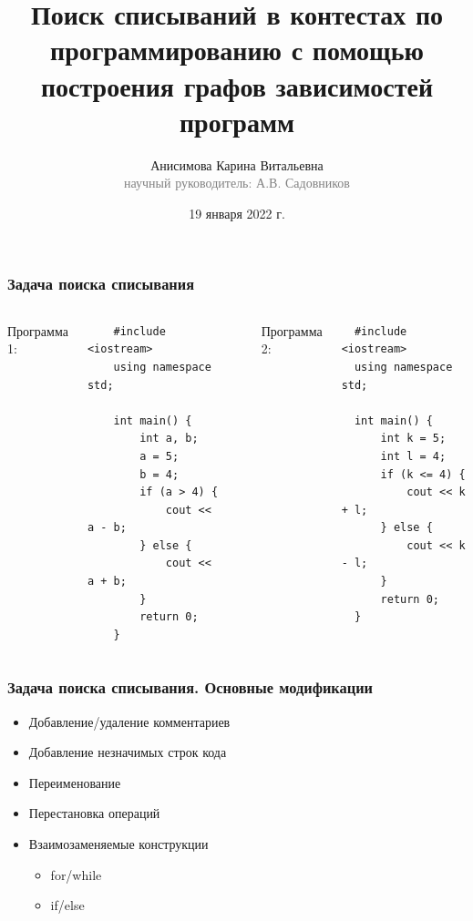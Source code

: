 \documentclass[10pt]{beamer}
\begin{document}
\title[Поиск списываний в контестах]{Поиск списываний в контестах по программированию с помощью построения графов зависимостей программ}

\author[Анисимова К.В.]{Анисимова Карина Витальевна\\{\footnotesize\textcolor{gray}{научный руководитель: А.В. Садовников}}}
\date{19 января 2022 г.}
\frame{\titlepage}

\begin{frame}[fragile]\frametitle{Задача поиска списывания}
\begin{columns}[T]
  Программа 1:

  \begin{verbatim}
    #include <iostream>
    using namespace std;
    
    int main() {
        int a, b;
        a = 5;
        b = 4;
        if (a > 4) {
            cout << a - b;
        } else {
            cout << a + b;
        }
        return 0;
    }
  \end{verbatim}
  
  	\rule{.1mm}{0.7\textheight}


  Программа 2:

  \begin{verbatim}
  #include <iostream>
  using namespace std;
  
  int main() {
      int k = 5;
      int l = 4;
      if (k <= 4) {
          cout << k + l;
      } else {
          cout << k - l;
      }
      return 0;
  }
  \end{verbatim}
  
\end{columns}
      
  
  
\end{frame}

\begin{frame}[fragile]\frametitle{Задача поиска списывания. Основные модификации}
	\begin{itemize}
		\item Добавление/удаление комментариев
		\item Добавление незначимых строк кода
		\item Переименование
		\item Перестановка операций
		\item Взаимозаменяемые конструкции
		\begin{itemize}
			\item for/while
			\item if/else
		\end{itemize}
	\end{itemize}
\end{frame}
\end{document}
